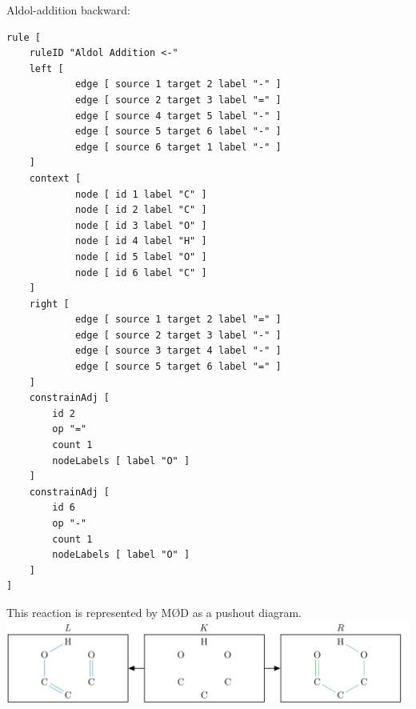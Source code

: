 \documentclass[a4paper,10pt,titlepage]{report}
\begin{document}
Aldol-addition backward:
\begin{lstlisting}
rule [
	ruleID "Aldol Addition <-"	
	left [
            edge [ source 1 target 2 label "-" ]
            edge [ source 2 target 3 label "=" ]
            edge [ source 4 target 5 label "-" ]
            edge [ source 5 target 6 label "-" ]
            edge [ source 6 target 1 label "-" ]
	]
	context [
            node [ id 1 label "C" ]
            node [ id 2 label "C" ]
            node [ id 3 label "O" ]
            node [ id 4 label "H" ]
            node [ id 5 label "O" ]
            node [ id 6 label "C" ]
	]
	right [
            edge [ source 1 target 2 label "=" ]
            edge [ source 2 target 3 label "-" ]
            edge [ source 3 target 4 label "-" ]
            edge [ source 5 target 6 label "=" ]
	]	
	constrainAdj [
	    id 2
	    op "="
	    count 1
	    nodeLabels [ label "O" ]
	]
	constrainAdj [
	    id 6
	    op "-"
	    count 1
	    nodeLabels [ label "O" ]
	]
]

\end{lstlisting}
This reaction is represented by MØD as a pushout diagram. 
\\
\includegraphics[scale= 0.5]{aldol}
\end{document}
